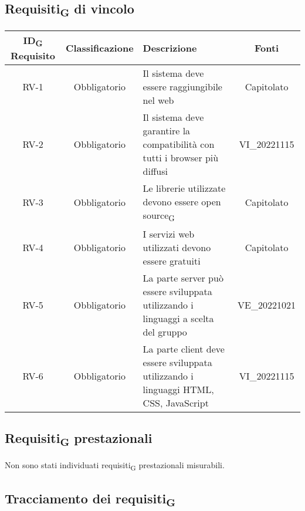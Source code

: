 \subsection{Requisiti\textsubscript{G} di vincolo}
\renewcommand\tabularxcolumn[1]{>{\Centering}m{#1}}
\begin{tabularx}{\textwidth}{| c | c | X | c |} 
 \hline
 \textbf{ID\textsubscript{G} Requisito} & \textbf{Classificazione} & \textbf{Descrizione} & \textbf{Fonti} \\
 \hline
 RV-1 & Obbligatorio &  Il sistema deve essere raggiungibile nel web & Capitolato\\
 \hline
  RV-2 & Obbligatorio & Il sistema deve garantire la compatibilità con tutti i browser più diffusi & VI\_20221115\\
 \hline
 RV-3 & Obbligatorio &  Le librerie utilizzate devono essere open source\textsubscript{G} & Capitolato\\
 \hline
 RV-4 & Obbligatorio & I servizi web utilizzati devono essere gratuiti &  Capitolato\\
 \hline
 RV-5 & Obbligatorio & La parte server può essere sviluppata utilizzando i linguaggi a scelta del gruppo & VE\_20221021\\
 \hline
 RV-6 & Obbligatorio & La parte client deve essere sviluppata utilizzando i linguaggi HTML, CSS, JavaScript & VI\_20221115\\
 \hline
\end{tabularx}

\subsection{Requisiti\textsubscript{G} prestazionali}
Non sono stati individuati requisiti\textsubscript{G} prestazionali misurabili.

\subsection{Tracciamento dei requisiti\textsubscript{G}}

